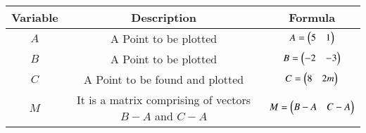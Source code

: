\begin{center}
    \begin{tabular}{|c|c|c|} 
        \hline
            \textbf{Variable} & \textbf{Description} & \textbf{Formula} \\ 
        \hline
            $A$   & A Point to be plotted & $A = \begin{pmatrix}5 & 1\end{pmatrix}$\\ 
        \hline
            $B$   & A Point to be plotted & $B = \begin{pmatrix}-2 & -3\end{pmatrix}$\\ 
        \hline
            $C$   & A Point to be found and plotted & $C  = \begin{pmatrix}8 & 2m\end{pmatrix}$\\ 
        \hline
            $M$   & It is a matrix comprising of vectors $B-A$ and $C-A$ & $M = \begin{pmatrix}B-A & C-A\end{pmatrix}$\\ 
        \hline
    \end{tabular}
\end{center}  



